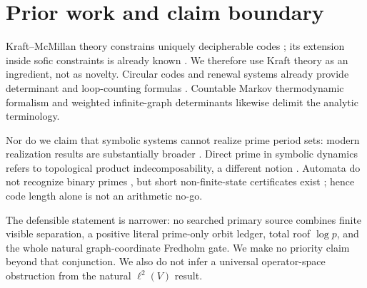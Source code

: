 \section{Prior work and claim boundary}

Kraft--McMillan theory constrains uniquely decipherable codes
\citep{mcmillan1956}; its extension inside sofic constraints is already
known \citep{bealperrin2005}.  We therefore use Kraft theory as an ingredient,
not as novelty.  Circular codes and renewal systems already provide
determinant and loop-counting formulas
\citep{keller1991,hong2011,bealperrinrestivo2024}.  Countable Markov
thermodynamic formalism \citep{sarig1999} and weighted infinite-graph
determinants \citep{deitmar2015} likewise delimit the analytic terminology.

Nor do we claim that symbolic systems cannot realize prime period sets:
modern realization results are substantially broader
\citep{dejong2026}.  Direct prime in symbolic dynamics refers to
topological product indecomposability, a different notion
\citep{kopra2023}.  Automata do not recognize binary primes
\citep{hartmanisshank1968}, but short non-finite-state certificates exist
\citep{pratt1975}; hence code length alone is not an arithmetic no-go.

The defensible statement is narrower: no searched primary source combines
finite visible separation, a positive literal prime-only orbit ledger, total
roof $\log p$, and the whole natural graph-coordinate Fredholm gate.  We
make no priority claim beyond that conjunction.  We also do not infer a
universal operator-space obstruction from the natural $\ell^2(V)$ result.
